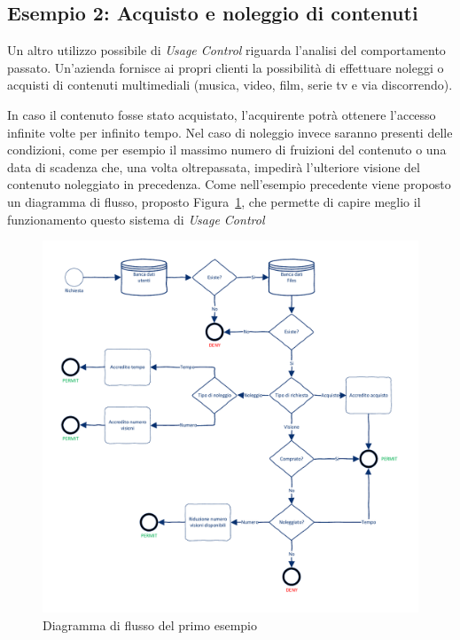 \subsection*{Esempio 2: Acquisto e noleggio di contenuti}
Un altro utilizzo possibile di \textit{Usage Control} riguarda l'analisi del comportamento passato. Un'azienda fornisce  ai propri clienti 
la possibilità di effettuare noleggi o acquisti di contenuti multimediali (musica, video, film, serie tv e via discorrendo).\\ \par
In caso il contenuto fosse stato acquistato, l’acquirente potrà ottenere
l’accesso infinite volte per infinito tempo. Nel caso di noleggio invece
saranno presenti delle condizioni, come per esempio il massimo numero
di fruizioni del contenuto o una data di scadenza che, una volta oltrepassata,
impedirà l’ulteriore visione del contenuto noleggiato in precedenza.
Come nell’esempio precedente viene proposto un diagramma di flusso,
proposto Figura~\ref{fig:diagrammaflussosecondoesempio}, che permette di capire meglio il funzionamento questo sistema di \textit{Usage Control}
\begin{figure}[H]
 \centering 
 \includegraphics[scale = 0.75]{./Visio_Project/DiagrammaFlussoSecondoEsempio.pdf}
 \caption{Diagramma di flusso del primo esempio}
 \label{fig:diagrammaflussosecondoesempio}
\end{figure}
